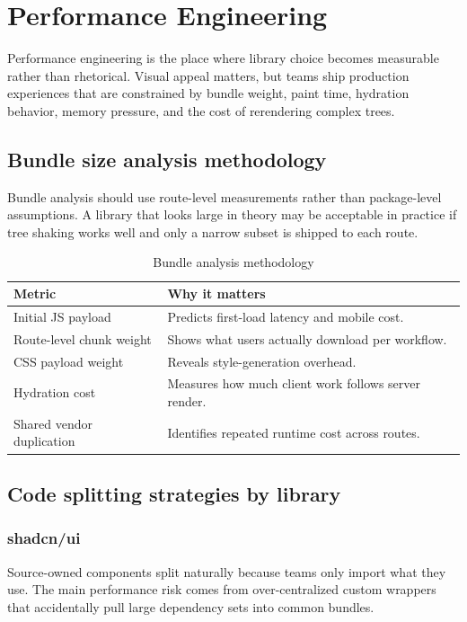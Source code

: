 \clearpage
\section{Performance Engineering}

Performance engineering is the place where library choice becomes measurable rather than rhetorical. Visual appeal matters, but teams ship production experiences that are constrained by bundle weight, paint time, hydration behavior, memory pressure, and the cost of rerendering complex trees.

\subsection{Bundle size analysis methodology}
Bundle analysis should use route-level measurements rather than package-level assumptions. A library that looks large in theory may be acceptable in practice if tree shaking works well and only a narrow subset is shipped to each route.

\begin{table}[htbp]
  \centering
  \caption{Bundle analysis methodology}
  \begin{tabularx}{\textwidth}{@{}p{}Y@{}}
    \toprule
    \textbf{Metric} & \textbf{Why it matters} \\
    \midrule
    Initial JS payload & Predicts first-load latency and mobile cost. \\
    Route-level chunk weight & Shows what users actually download per workflow. \\
    CSS payload weight & Reveals style-generation overhead. \\
    Hydration cost & Measures how much client work follows server render. \\
    Shared vendor duplication & Identifies repeated runtime cost across routes. \\
    \bottomrule
  \end{tabularx}
\end{table}

\subsection{Code splitting strategies by library}
\subsubsection{shadcn/ui}
Source-owned components split naturally because teams only import what they use. The main performance risk comes from over-centralized custom wrappers that accidentally pull large dependency sets into common bundles.

